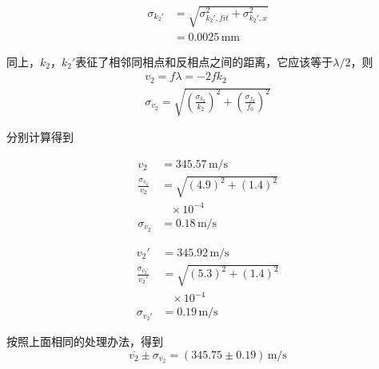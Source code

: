 \documentclass[10pt, twocolumn]{article}
\begin{document}
\begin{minipage}{0.23\textwidth}
\begin{equation*}
    \begin{aligned}
        \sigma_{k_2'} &= \sqrt{\sigma_{k_2',fit}^2+\sigma_{k_2',x}^2} \\
        &= 0.0025\,\text{mm}
    \end{aligned}
\end{equation*}
\end{minipage}
\par 
同上，$k_2$，$k_2'$表征了相邻同相点和反相点之间的距离，它应该等于$\lambda/2$，则\\
\[
\begin{aligned} 
    v_2=f\lambda=-2fk_2 \\
    \sigma_{v_2}=\sqrt{(\frac{\sigma_{k_2}}{k_2})^2+(\frac{\sigma_{f_0}}{f_0})^2}
\end{aligned}
\]
\par
分别计算得到\\
\begin{minipage}{0.23\textwidth}
    \begin{equation*}
        \begin{aligned}
            v_2&=345.57\,\text{m/s}\\
            \frac{\sigma_{v_2}}{v_2}&=\sqrt{(4.9)^2+(1.4)^2}\\
            &\;\;\;\times 10^{-4} \\
            \sigma_{v_2}&=0.18\,\text{m/s}
        \end{aligned}
    \end{equation*}
    \end{minipage}
    \begin{minipage}{0.23\textwidth}
    \begin{equation*}
        \begin{aligned}
            v_2'&=345.92\,\text{m/s}\\
            \frac{\sigma_{v_2'}}{v_2'}&=\sqrt{(5.3)^2+(1.4)^2}\\
                        &\;\;\;\times 10^{-4} \\
            \sigma_{v_2'}&=0.19\,\text{m/s}
        \end{aligned}
    \end{equation*}
\end{minipage}
\par
按照上面相同的处理办法，得到\\
\begin{equation}
    \overline{v_2} \pm \sigma_{\overline{v_2}} = (345.75 \pm 0.19) \, \text{m/s}   
\end{equation}
\end{document}
